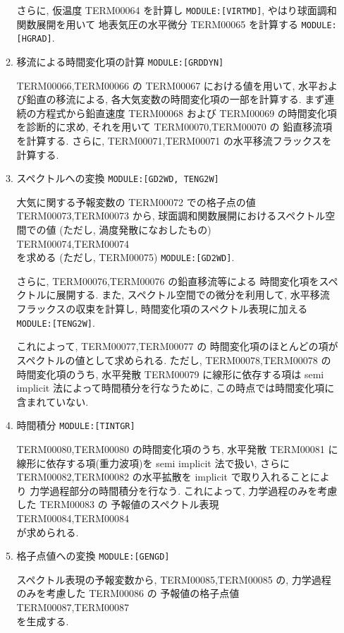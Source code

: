 \begin{enumerate}
\begin{enumerate}
さらに, 仮温度 TERM00064 を計算し \texttt{MODULE:[VIRTMD]},
やはり球面調和関数展開を用いて
地表気圧の水平微分 TERM00065 を計算する \texttt{MODULE:[HGRAD]}.


\item 移流による時間変化項の計算 \texttt{MODULE:[GRDDYN]}

TERM00066,TERM00066 の TERM00067 における値を用いて,
水平および鉛直の移流による,
各大気変数の時間変化項の一部を計算する.
まず連続の方程式から鉛直速度 TERM00068 および
TERM00069 の時間変化項を診断的に求め,
それを用いて TERM00070,TERM00070 の 鉛直移流項を計算する.
さらに, TERM00071,TERM00071 の水平移流フラックスを計算する.

\item スペクトルへの変換 \texttt{MODULE:[GD2WD, TENG2W]}

大気に関する予報変数の TERM00072 での格子点の値
TERM00073,TERM00073  から, 
球面調和関数展開におけるスペクトル空間での値
(ただし, 渦度発散になおしたもの) \\
TERM00074,TERM00074 \\
を求める (ただし, TERM00075) \texttt{MODULE:[GD2WD]}.

さらに, TERM00076,TERM00076 の鉛直移流等による
時間変化項をスペクトルに展開する.
また, スペクトル空間での微分を利用して,
水平移流フラックスの収束を計算し, 
時間変化項のスペクトル表現に加える \texttt{MODULE:[TENG2W]}.

これによって, TERM00077,TERM00077 の
時間変化項のほとんどの項がスペクトルの値として求められる.
ただし, TERM00078,TERM00078 の時間変化項のうち,
水平発散 TERM00079 に線形に依存する項は
semi implicit 法によって時間積分を行なうために,
この時点では時間変化項に含まれていない.

\item 時間積分 \texttt{MODULE:[TINTGR]}

TERM00080,TERM00080 の時間変化項のうち,
水平発散 TERM00081 に線形に依存する項(重力波項)を
semi implicit 法で扱い,
さらに TERM00082,TERM00082 の水平拡散を
implicit で取り入れることにより
力学過程部分の時間積分を行なう. 
これによって, 力学過程のみを考慮した TERM00083 の
予報値のスペクトル表現 \\
TERM00084,TERM00084  \\
が求められる.

\item 格子点値への変換 \texttt{MODULE:[GENGD]}

スペクトル表現の予報変数から,
TERM00085,TERM00085 の,
力学過程のみを考慮した TERM00086 の
予報値の格子点値 \\
TERM00087,TERM00087  \\
を生成する.


\end{enumerate}
\end{enumerate}
